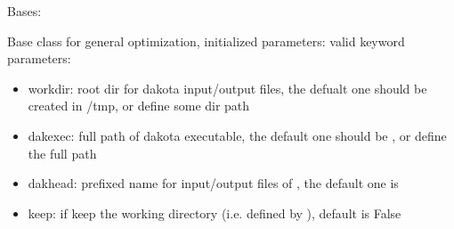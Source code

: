 \documentclass[letterpaper,10pt,english]{sphinxmanual}
\begin{document}

\begin{fulllineitems}
\label{\detokenize{src/apidocs/genopt:genopt.DakotaBase}}
Bases: \href{https://docs.python.org/2/library/functions.html\#object}{}

Base class for general optimization, initialized parameters:
valid keyword parameters:
\begin{itemize}
\item {} 
workdir: root dir for dakota input/output files,
the defualt one should be created in /tmp, or define some dir path

\item {} 
dakexec: full path of dakota executable,
the default one should be , or define the full path

\item {} 
dakhead: prefixed name for input/output files of , 
the default one is 

\item {} 
keep: if keep the working directory (i.e. defined by ), default is False

\end{itemize}

\begin{fulllineitems}
\label{\detokenize{src/apidocs/genopt:genopt.DakotaBase.dakexec}}
\end{fulllineitems}


\begin{fulllineitems}
\label{\detokenize{src/apidocs/genopt:genopt.DakotaBase.dakhead}}
\end{fulllineitems}


\begin{fulllineitems}
\label{\detokenize{src/apidocs/genopt:genopt.DakotaBase.keep}}
\end{fulllineitems}


\begin{fulllineitems}
\label{\detokenize{src/apidocs/genopt:genopt.DakotaBase.workdir}}
\end{fulllineitems}


\end{fulllineitems}
\end{document}
